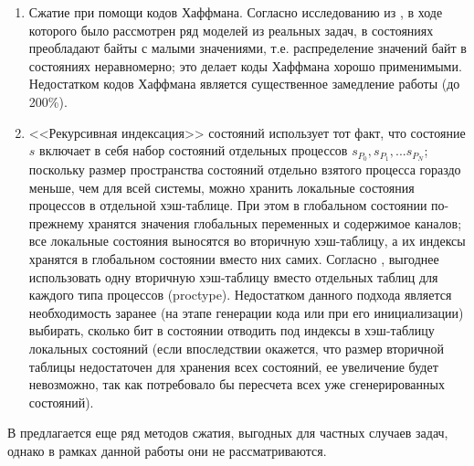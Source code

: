 \begin{enumerate}
\item Сжатие при помощи кодов Хаффмана. Согласно исследованию из \cite{StateCompr}, в ходе
  которого было рассмотрен ряд моделей из реальных задач, в состояниях преобладают байты с
  малыми значениями, т.е. распределение значений байт в состояниях неравномерно; это
  делает коды Хаффмана хорошо применимыми. Недостатком кодов Хаффмана является
  существенное замедление работы (до 200\%).

\item <<Рекурсивная индексация>> состояний использует тот факт, что состояние $s$ включает
  в себя набор состояний отдельных процессов $s_{P_0}, s_{P_1}, ... s_{P_N}$; поскольку
  размер пространства состояний отдельно взятого процесса гораздо меньше, чем для всей
  системы, можно хранить локальные состояния процессов в отдельной хэш-таблице. При этом в
  глобальном состоянии по-прежнему хранятся значения глобальных переменных и содержимое
  каналов; все локальные состояния выносятся во вторичную хэш-таблицу, а их индексы
  хранятся в глобальном состоянии вместо них самих. Согласно \cite{StateCompr}, выгоднее
  использовать одну вторичную хэш-таблицу вместо отдельных таблиц для каждого типа
  процессов (proctype). Недостатком данного подхода является необходимость заранее (на
  этапе генерации кода или при его инициализации) выбирать, сколько бит в состоянии
  отводить под индексы в хэш-таблицу локальных состояний (если впоследствии окажется, что
  размер вторичной таблицы недостаточен для хранения всех состояний, ее увеличение будет
  невозможно, так как потребовало бы пересчета всех уже сгенерированных состояний).
\end{enumerate}

В \cite{StateCompr} предлагается еще ряд методов сжатия, выгодных для частных случаев
задач, однако в рамках данной работы они не рассматриваются.

